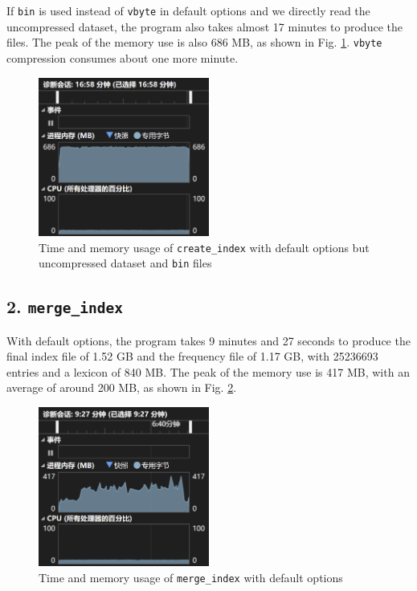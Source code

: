 \documentclass[12pt]{article}
\begin{document}
If \texttt{bin} is used instead of \texttt{vbyte} in default options and
we directly read the uncompressed dataset, the program also takes almost
17 minutes to produce the files. The peak of the memory use is also 686
MB, as shown in Fig. \ref{create_bin}. \texttt{vbyte} compression consumes about one more
minute.

\begin{figure}[!h]
  \centering
  \includegraphics[width=0.5\textwidth]{readme.assets/create_bin-1699316895867-4.png}
  \caption{Time and memory usage of \texttt{create\_index} with default options but uncompressed dataset and \texttt{bin} files}
  \label{create_bin}
\end{figure}

\hypertarget{2-mergeindex-3}{%
\subsection{\texorpdfstring{2.
\texttt{merge\_index}}{2. merge\_index}}\label{2-mergeindex-3}}

With default options, the program takes 9 minutes and 27 seconds to
produce the final index file of 1.52 GB and the frequency file of 1.17
GB, with 25236693 entries and a lexicon of 840 MB. The peak of the
memory use is 417 MB, with an average of around 200 MB, as shown in Fig. \ref{merge_vbyte}.

\begin{figure}[!h]
  \centering
  \includegraphics[width=0.5\textwidth]{readme.assets/merge_vbyte-1699317018747-6.png}
  \vspace{-4pt}
  \caption{Time and memory usage of \texttt{merge\_index} with default options}
  \label{merge_vbyte}
  \vspace{-4pt}
\end{figure}
\end{document}
